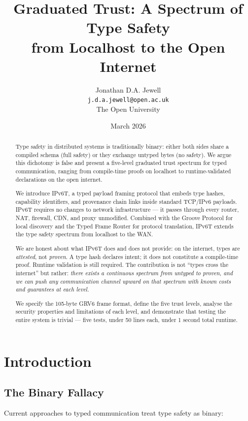 \documentclass[11pt,a4paper]{article}
\title{Graduated Trust: A Spectrum of Type Safety\\
from Localhost to the Open Internet}
\author{Jonathan D.A. Jewell\\
\texttt{j.d.a.jewell@open.ac.uk}\\
The Open University}
\date{March 2026}
\begin{document}
\maketitle

\begin{abstract}
Type safety in distributed systems is traditionally binary: either both
sides share a compiled schema (full safety) or they exchange untyped
bytes (no safety). We argue this dichotomy is false and present a
five-level graduated trust spectrum for typed communication, ranging
from compile-time proofs on localhost to runtime-validated declarations
on the open internet.

We introduce IPv6T, a typed payload framing protocol that embeds type
hashes, capability identifiers, and provenance chain links inside
standard TCP/IPv6 payloads. IPv6T requires no changes to network
infrastructure --- it passes through every router, NAT, firewall, CDN,
and proxy unmodified. Combined with the Groove Protocol for local
discovery and the Typed Frame Router for protocol translation, IPv6T
extends the type safety spectrum from localhost to the WAN.

We are honest about what IPv6T does and does not provide: on the
internet, types are \emph{attested}, not \emph{proven}. A type hash
declares intent; it does not constitute a compile-time proof. Runtime
validation is still required. The contribution is not ``types cross the
internet'' but rather: \emph{there exists a continuous spectrum from
untyped to proven, and we can push any communication channel upward on
that spectrum with known costs and guarantees at each level.}

We specify the 105-byte GRV6 frame format, define the five trust
levels, analyse the security properties and limitations of each level,
and demonstrate that testing the entire system is trivial --- five tests,
under 50 lines each, under 1 second total runtime.
\end{abstract}

\section{Introduction}

\subsection{The Binary Fallacy}

Current approaches to typed communication treat type safety as binary:
\end{document}
